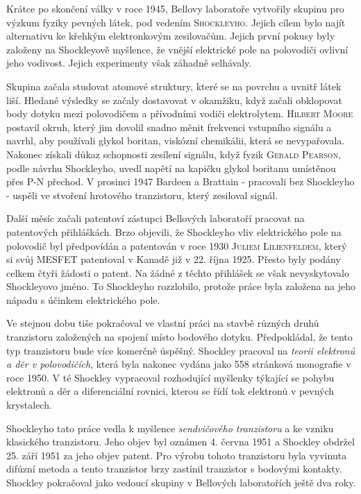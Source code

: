     \begin{mdframed}[style=mdnote]
      \small
      Krátce po skončení války v roce 1945, Bellovy laboratoře vytvořily skupinu pro výzkum fyziky
      pevných látek, pod vedením \textsc{Shockleyho}. Jejich cílem bylo najít alternativu ke křehkým
      elektronkovým zesilovačům. Jejich první pokusy byly založeny na Shockleyově myšlence, že
      vnější elektrické pole na polovodiči ovlivní jeho vodivost. Jejich experimenty však záhadně
      selhávaly.

      Skupina začala studovat atomové struktury, které se na povrchu a uvnitř látek liší. Hledané
      výsledky se začaly dostavovat v okamžiku, když začali obklopovat body dotyku mezi polovodičem
      a přívodními vodiči elektrolytem. \textsc{Hilbert Moore} postavil okruh, který jim dovolil
      snadno měnit frekvenci vstupního signálu a navrhl, aby používali glykol boritan, viskózní
      chemikálii, která se nevypařovala. Nakonec získali důkaz schopnosti zesílení signálu, když
      fyzik \textsc{Gerald Pearson}, podle návrhu Shockleyho, uvedl napětí na kapičku glykol
      boritanu umístěnou přes \textsc{P-N} přechod. V prosinci 1947 Bardeen a Brattain - pracovali
      bez Shockleyho - uspěli ve stvoření hrotového tranzistoru, který zesiloval signál.

      Další měsíc začali patentoví zástupci Bellových laboratoří pracovat na patentových
      přihláškách. Brzo objevili, že Shockleyho vliv elektrického pole na polovodič byl předpovídán
      a patentován v roce 1930 \textsc{Juliem Lilienfeldem}, který si svůj \textsc{MESFET}
      patentoval v Kanadě již v 22. října 1925. Přesto byly podány celkem čtyři žádosti o patent. Na
      žádné z těchto přihlášek se však nevyskytovalo Shockleyovo jméno. To Shockleyho rozzlobilo,
      protože práce byla založena na jeho nápadu s účinkem elektrického pole. 
      
      Ve stejnou dobu tiše pokračoval ve vlastní práci na stavbě různých druhů tranzistoru
      založených na spojení místo bodového dotyku. Předpokládal, že tento typ tranzistoru bude více
      komerčně úspěšný. Shockley pracoval na \emph{teorii elektronů a děr v polovodičích}, která
      byla nakonec vydána jako 558 stránková monografie v roce 1950. V té Shockley vypracoval
      rozhodující myšlenky týkající se pohybu elektronů a děr a diferenciální rovnici, kterou se
      řídí tok elektronů v pevných krystalech.

      Shockleyho tato práce vedla k myšlence \emph{sendvičového tranzistoru} a ke vzniku klasického
      tranzistoru. Jeho objev byl oznámen 4. června 1951 a Shockley obdržel 25. září 1951 za jeho
      objev patent. Pro výrobu tohoto tranzistoru byla vyvinuta difúzní metoda a tento tranzistor
      brzy zastínil tranzistor s bodovými kontakty. Shockley pokračoval jako vedoucí skupiny v
      Bellových laboratořích ještě dva roky.


\end{mdframed}
